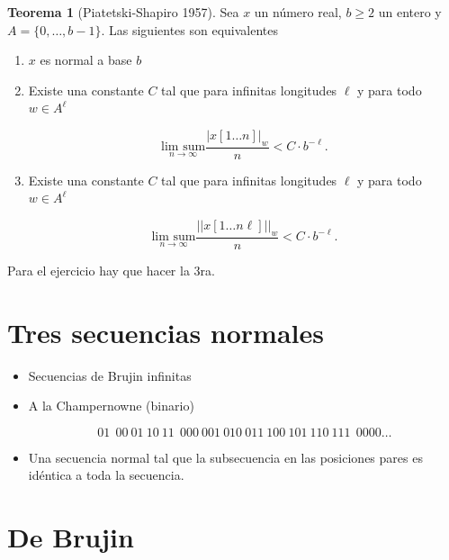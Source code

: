 \documentclass{report}
\theoremstyle{definition} %
\newtheorem{theorem}{Teorema}
\begin{document}
\begin{theorem}[Piatetski-Shapiro 1957]
    Sea $x$ un número real, $b \geq 2$ un entero y $A = \{0, \dots, b - 1\}$.
    Las siguientes son equivalentes
    \begin{enumerate}
        \item $x$ es normal a base $b$
        \item Existe una constante $C$ tal que para infinitas longitudes $\ell$ y
        para todo $w \in A^\ell$

        $$
            \underset{n \to \infty}{\text{lim sum}}
            \frac{|x[1\dots n]|_w}{n} < C \cdot b^{-\ell}.
        $$
        \item Existe una constante $C$ tal que para infinitas longitudes $\ell$ y
        para todo $w \in A^\ell$

        $$
            \underset{n \to \infty}{\text{lim sum}}
            \frac{||x[1\dots n\ell]||_w}{n} < C \cdot b^{-\ell}.
        $$ 
    \end{enumerate}
\end{theorem}

Para el ejercicio hay que hacer la 3ra.

\section{Tres secuencias normales}

\begin{itemize}
    \item Secuencias de Brujin infinitas
    \item A la Champernowne (binario)
    
    $$01\ \ 00\ 01\ 10\ 11\ \ 000\ 001\ 010\ 011\ 100\ 101\ 110\ 111\ \ 0000 \dots$$

    \item Una secuencia normal tal que la subsecuencia en las posiciones pares
    es idéntica a toda la secuencia.
\end{itemize}

\section{De Brujin}
\end{document}
